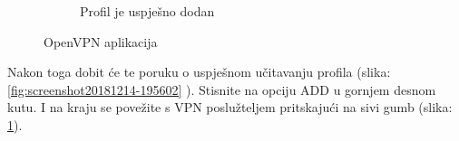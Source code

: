 \begin{figure}[h]
\begin{subfigure}{0.49\textwidth}
		\caption{Profil je uspješno dodan}
		\label{fig:screenshot20181214-195614}
	\end{subfigure}
	\caption{OpenVPN aplikacija}
	\label{fig:combined}
\end{figure}
Nakon toga dobit će te poruku o uspješnom učitavanju profila (slika: \ref{fig:screenshot20181214-195602} ). Stisnite na opciju ADD u gornjem desnom kutu. I na kraju se povežite s VPN poslužteljem pritskajući na sivi gumb (slika: \ref{fig:screenshot20181214-195614}). 


